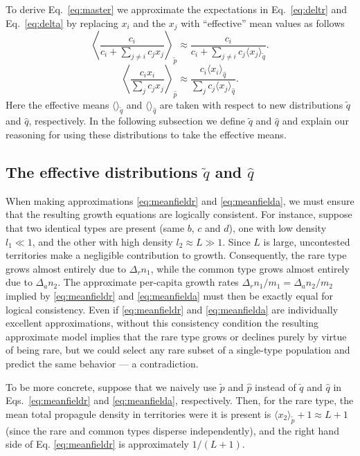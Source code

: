 \documentclass[12pt]{article}
\begin{document}
To derive Eq.~\eqref{eq:master} we approximate the expectations in Eq.~\eqref{eq:deltr} and Eq.~\eqref{eq:delta} by replacing $x_i$ and the $x_j$ with ``effective'' mean values as follows 
\begin{equation}
\left\langle\frac{c_i}{c_i +\sum_{j\neq i} c_j x_j}\right\rangle_{\tilde{p}}\approx \frac{c_i}{c_i +\sum_{j\neq i} c_j \langle x_j\rangle_{\tilde{q}}}.\label{eq:meanfieldr}
\end{equation}
\begin{equation}
\left\langle \frac{c_i x_i}{\sum_j c_j x_j} \right\rangle_{\hat{p}}\approx  \frac{c_i \langle x_i \rangle_{\hat{q}}}{\sum_j c_j \langle x_j\rangle_{\hat{q}}}.\label{eq:meanfielda}
\end{equation}
Here the effective means $\langle \rangle_{\tilde{q}}$ and $\langle \rangle_{\hat{q}}$ are taken with respect to new distributions $\tilde{q}$ and $\hat{q}$, respectively. In the following subsection we define $\tilde{q}$ and $\hat{q}$ and explain our reasoning for using these distributions to take the effective means. 

\subsection*{The effective distributions $\tilde{q}$ and $\hat{q}$}

When making approximations \eqref{eq:meanfieldr} and \eqref{eq:meanfielda}, we must ensure that the resulting growth equations are logically consistent. For instance, suppose that two identical types are present (same $b$, $c$ and $d$), one with low density $l_1\ll 1$, and the other with high density $l_2\approx L\gg 1$. Since $L$ is large, uncontested territories make a negligible contribution to growth. Consequently, the rare type grows almost entirely due to $\Delta_r n_1$, while the common type grows almost entirely due to $\Delta_a n_2$. The approximate per-capita growth rates $\Delta_r n_1/m_1 = \Delta_a n_2/m_2$ implied by \eqref{eq:meanfieldr} and \eqref{eq:meanfielda} must then be exactly equal for logical consistency. Even if \eqref{eq:meanfieldr} and \eqref{eq:meanfielda} are individually excellent approximations, without this consistency condition the resulting approximate model implies that the rare type grows or declines purely by virtue of being rare, but we could select any rare subset of a single-type population and predict the same behavior --- a contradiction.

To be more concrete, suppose that we naively use $\tilde{p}$ and $\hat{p}$ instead of $\tilde{q}$ and $\hat{q}$ in Eqs.~\eqref{eq:meanfieldr} and \eqref{eq:meanfielda}, respectively. Then, for the rare type, the mean total propagule density in territories were it is present is $\langle x_2\rangle_{\tilde{p}}+1\approx L+1$ (since the rare and common types disperse independently), and the right hand side of Eq. \eqref{eq:meanfieldr} is approximately $1/(L+1)$. 
\end{document}
